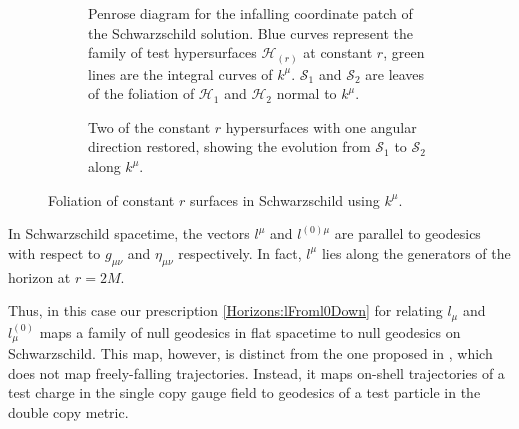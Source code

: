 \begin{figure}[h]
    \centering
    \begin{subfigure}[t]{0.60\textwidth}
        \centering
        \def\svgwidth{\columnwidth}
        
        \caption{Penrose diagram for the infalling coordinate patch of the Schwarzschild solution. Blue curves
        represent the family of test hypersurfaces $\mathcal{H}_{(r)}$ at constant $r$, green lines are the
    integral curves of $k^{\mu}$. $\mathcal{S}_{1}$ and $\mathcal{S}_{2}$ are leaves of the foliation of
$\mathcal{H}_{1}$ and $\mathcal{H}_{2}$ normal to $k^{\mu}$.}
    \end{subfigure}\hspace{2em}%
    \begin{subfigure}[t]{0.27\textwidth}
        \centering
        \def\svgwidth{\columnwidth}
        
        \caption{Two of the constant $r$ hypersurfaces with one angular direction
        restored, showing the evolution from $\mathcal{S}_{1}$ to $\mathcal{S}_{2}$ along $k^{\mu}$.}
    \end{subfigure}
    \caption{Foliation of constant $r$ surfaces in Schwarzschild using $k^{\mu}$.} \label{Horizons:figSchw}
\end{figure}
%
In Schwarzschild spacetime, the vectors $l^{\mu}$ and $l^{(0)\mu}$ are parallel to geodesics with
respect to $g_{\mu \nu}$ and $\eta_{\mu \nu}$ respectively. In fact, $l^{\mu}$ lies along the generators of the
horizon at $r = 2M$.

Thus, in this case our prescription \eqref{Horizons:lFroml0Down} for relating $l_{\mu}$ and $l_{\mu}^{(0)}$ maps a family of
null geodesics in flat spacetime to null geodesics on Schwarzschild. This map, however, is distinct from the one
proposed in \cite{Gonzo:2021drq}, which does not map freely-falling trajectories. Instead, it maps
on-shell trajectories of a test charge in the single copy gauge field to geodesics of a test particle in the double
copy metric.

